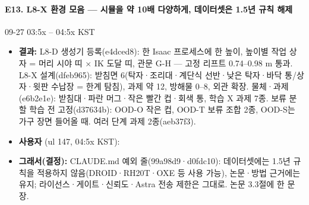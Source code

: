 \paragraph{E13. L8-X 환경 모음 --- 시뮬을 약 10배 다양하게, 데이터셋은 1.5년 규칙 해제}
{\small 09-27 03:5x -- 04:5x KST}
\begin{itemize}
  \item \textbf{결과:} L8-D 생성기 등록(e4dced8): 한 Isaac 프로세스에 한 높이, 높이별 작업 상자 = 머리 시야 띠 $\times$ IK 도달 띠, 관문 G-H --- 고정 리프트 0.74--0.98 m 통과. L8-X 설계(dfeb965): 받침면 6(탁자·조리대·계단식 선반·낮은 탁자·바닥 통/상자·윗판 수납장 = 한계 탐침), 과제 약 12, 방해물 0--8, 외관 확장. 물체·과제(e6b2e1e): 받침대·파란 머그·작은 빨간 컵·회색 통, 학습 X 과제 7종. 보류 분할 학습 전 고정(d37634b): OOD-O 작은 컵, OOD-T 보류 조합 2종, OOD-S는 가구 장면 들어올 때. 여러 단계 과제 2종(aeb37f3).
  \item \textbf{사용자} (ul 147, 04:5x KST): 
  \item \textbf{그래서(결정):} CLAUDE.md 예외 줄(99a98d9·d0fdc10): 데이터셋에는 1.5년 규칙을 적용하지 않음(DROID·RH20T·OXE 등 사용 가능), 논문·방법 근거에는 유지; 라이선스·게이트·신뢰도·Astra 전송 제한은 그대로. 논문 3.3절에 한 문장.
\end{itemize}

